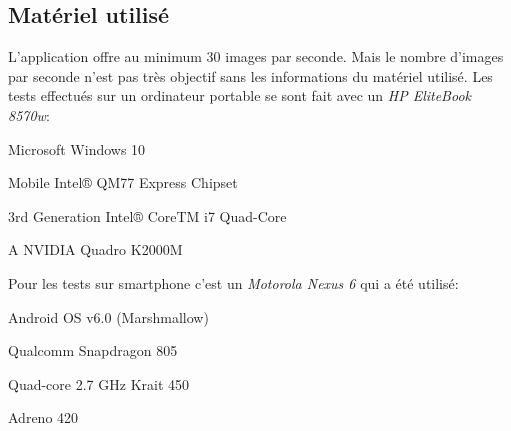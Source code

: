 \subsection{Matériel utilisé}
L'application offre au minimum 30 images par seconde. Mais le nombre d'images par seconde n'est pas très objectif sans les informations du matériel utilisé. Les tests effectués sur un ordinateur portable se sont fait avec un \emph{HP EliteBook 8570w}:

\begin{description}[align=right, labelwidth=3cm]
	\item [OS] Microsoft Windows 10
	\item [Chipset]	Mobile Intel® QM77 Express Chipset
	\item [CPU] 3rd Generation Intel® CoreTM i7 Quad-Core
	\item [GPU] A NVIDIA Quadro K2000M
\end{description}

Pour les tests sur smartphone c'est un \emph{Motorola Nexus 6} qui a été utilisé:

\begin{description}[align=right, labelwidth=3cm]
	\item [OS] 	Android OS v6.0 (Marshmallow)
	\item [Chipset]	Qualcomm Snapdragon 805
	\item [CPU] Quad-core 2.7 GHz Krait 450
	\item [GPU] Adreno 420
\end{description}
